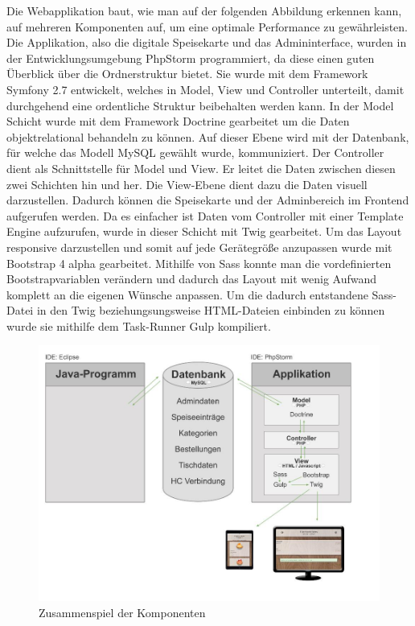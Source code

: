 Die Webapplikation baut, wie man auf der folgenden Abbildung erkennen kann, auf mehreren Komponenten auf, um eine optimale Performance zu gewährleisten.
Die Applikation, also die digitale Speisekarte und das Admininterface, wurden in der Entwicklungsumgebung PhpStorm programmiert, da diese einen guten Überblick über die Ordnerstruktur bietet.
Sie wurde mit dem Framework Symfony 2.7 entwickelt, welches in Model, View und Controller unterteilt, damit durchgehend eine ordentliche Struktur beibehalten werden kann. In der Model Schicht wurde mit dem Framework Doctrine gearbeitet um die Daten objektrelational behandeln zu können. Auf dieser Ebene wird mit der Datenbank, für welche das Modell MySQL gewählt wurde, kommuniziert.
Der Controller dient als Schnittstelle für Model und View. Er leitet die Daten zwischen diesen zwei Schichten hin und her.
Die View-Ebene dient dazu die Daten visuell darzustellen. Dadurch können die Speisekarte und der Adminbereich im Frontend aufgerufen werden. Da es einfacher ist Daten vom Controller mit einer Template Engine aufzurufen, wurde in dieser Schicht mit Twig gearbeitet. Um das Layout responsive darzustellen und somit auf jede Gerätegröße anzupassen wurde mit Bootstrap 4 alpha gearbeitet. Mithilfe von Sass konnte man die vordefinierten Bootstrapvariablen verändern und dadurch das Layout mit wenig Aufwand komplett an die eigenen Wünsche anpassen.
Um die dadurch entstandene Sass-Datei in den Twig beziehungsungsweise HTML-Dateien einbinden zu können wurde sie mithilfe dem Task-Runner Gulp kompiliert.\\
			\begin{figure}[H]
			\begin{centering}
			\includegraphics[width = 1\textwidth]{Bilder/Jok_zusammenspiel_applikation.jpg}
			\par\end{centering}
			\caption{Zusammenspiel der Komponenten}
			\label{Zusammenspiel der Komponenten}
			\end{figure}

